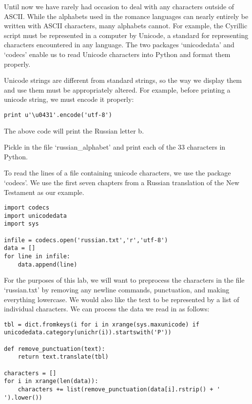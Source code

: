 

Until now we have rarely had occasion to deal with any characters outside of ASCII. While the alphabets used in the romance languages can nearly entirely be written with ASCII characters, many alphabets cannot. For example, the Cyrillic script must be represented in a computer by Unicode, a standard for representing characters encountered in any language. The two packages `unicodedata' and `codecs' enable us to read Unicode characters into Python and format them properly.

Unicode strings are different from standard strings, so the way we display them and use them must be appropriately altered. For example, before printing a unicode string, we must encode it properly:

\begin{lstlisting}[style=python]
print u'\u0431'.encode('utf-8')
\end{lstlisting}

The above code will print the Russian letter {\cyr b}.

\begin{problem}
Pickle in the file `russian\_alphabet' and print each of the $33$ characters in Python.
\end{problem}

To read the lines of a file containing unicode characters, we use the package `codecs'. We use the first seven chapters from a Russian translation of the New Testament as our example.

\begin{lstlisting}[style=python]
import codecs
import unicodedata
import sys

infile = codecs.open('russian.txt','r','utf-8')
data = []
for line in infile:
	data.append(line)
\end{lstlisting}

For the purposes of this lab, we will want to preprocess the characters in the file `russian.txt' by removing any newline commands, punctuation, and making everything lowercase. We would also like the text to be represented by a list of individual characters. We can process the data we read in as follows:

\begin{lstlisting}[style=python]
tbl = dict.fromkeys(i for i in xrange(sys.maxunicode) if unicodedata.category(unichr(i)).startswith('P'))

def remove_punctuation(text):
	return text.translate(tbl)

characters = []
for i in xrange(len(data)):
	characters += list(remove_punctuation(data[i].rstrip() + ' ').lower())
\end{lstlisting}

